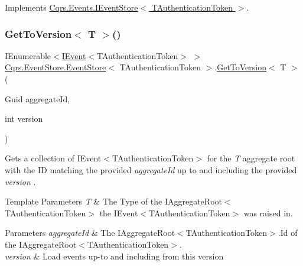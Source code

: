 Implements \hyperlink{interfaceCqrs_1_1Events_1_1IEventStore_a88b395dbd904b44a8690b630fb2af1ca_a88b395dbd904b44a8690b630fb2af1ca}{Cqrs.\+Events.\+I\+Event\+Store$<$ T\+Authentication\+Token $>$}.

\mbox{\label{classCqrs_1_1EventStore_1_1EventStore_a43d9cb0a660b9d2dd10d90c41dbf528e_a43d9cb0a660b9d2dd10d90c41dbf528e}} 
\subsubsection{\texorpdfstring{Get\+To\+Version$<$ T $>$()}{GetToVersion< T >()}}
{\footnotesize\ttfamily I\+Enumerable$<$\hyperlink{interfaceCqrs_1_1Events_1_1IEvent}{I\+Event}$<$T\+Authentication\+Token$>$ $>$ \hyperlink{classCqrs_1_1EventStore_1_1EventStore}{Cqrs.\+Event\+Store.\+Event\+Store}$<$ T\+Authentication\+Token $>$.\hyperlink{classCqrs_1_1EventStore_1_1EventStore_aae9da24e2ad4bbe6629c9419c850e03b_aae9da24e2ad4bbe6629c9419c850e03b}{Get\+To\+Version}$<$ T $>$ (\begin{DoxyParamCaption}\item[{Guid}]{aggregate\+Id,  }\item[{int}]{version }\end{DoxyParamCaption})}



Gets a collection of I\+Event$<$\+T\+Authentication\+Token$>$ for the {\itshape T} aggregate root with the ID matching the provided {\itshape aggregate\+Id}  up to and including the provided {\itshape version} . 


\begin{DoxyTemplParams}{Template Parameters}
{\em T} & The Type of the I\+Aggregate\+Root$<$\+T\+Authentication\+Token$>$ the I\+Event$<$\+T\+Authentication\+Token$>$ was raised in.\\
\hline
\end{DoxyTemplParams}

\begin{DoxyParams}{Parameters}
{\em aggregate\+Id} & The I\+Aggregate\+Root$<$\+T\+Authentication\+Token$>$.\+Id of the I\+Aggregate\+Root$<$\+T\+Authentication\+Token$>$.\\
\hline
{\em version} & Load events up-\/to and including from this version\\
\hline
\end{DoxyParams}


